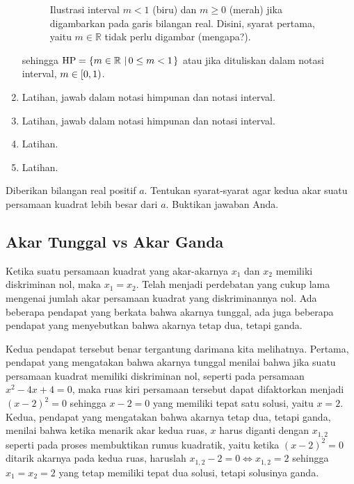 \begin{jawab}
\begin{enumerate}
\begin{minipage}[t]{\linewidth}
\begin{figure}[H]
					\caption{Ilustrasi interval $ m < 1 $ (biru) dan $ m \geq 0 $ (merah) jika digambarkan pada garis bilangan real. Disini, syarat pertama, yaitu $ m \in \mathbb{R} $ tidak perlu digambar (mengapa?).}
				\end{figure}
			\end{minipage}
			sehingga $ \mathop{}\!\mathrm{HP} = \mathop{}\!\left\lbrace{{m \in \mathbb{R}} \, \left|\, {0 \leq m < 1}\right.}\right\rbrace $ atau jika dituliskan dalam notasi interval, $ m \in \mathop{}\!\left[{0, 1}\right) $.
			\item Latihan, jawab dalam notasi himpunan dan notasi interval.
			\item Latihan, jawab dalam notasi himpunan dan notasi interval.
			\item Latihan.
			\item Latihan.
		\end{enumerate}
	\end{jawab}

	\begin{explbox}
		Diberikan bilangan real positif $ a $. Tentukan syarat-syarat agar kedua akar suatu persamaan kuadrat lebih besar dari $ a $. Buktikan jawaban Anda.
	\end{explbox}

\subsection{Akar Tunggal vs Akar Ganda}
	
	Ketika suatu persamaan kuadrat yang akar-akarnya $ x_{1} $ dan $ x_{2} $ memiliki diskriminan nol, maka $ x_{1} = x_{2} $. Telah menjadi perdebatan yang cukup lama mengenai jumlah akar persamaan kuadrat yang diskriminannya nol. Ada beberapa pendapat yang berkata bahwa akarnya tunggal, ada juga beberapa pendapat yang menyebutkan bahwa akarnya tetap dua, tetapi ganda.
	
	\par Kedua pendapat tersebut benar tergantung darimana kita melihatnya. Pertama, pendapat yang mengatakan bahwa akarnya tunggal menilai bahwa jika suatu persamaan kuadrat memiliki diskriminan nol, seperti pada persamaan $ x^{2} - 4x + 4 = 0 $, maka ruas kiri persamaan tersebut dapat difaktorkan menjadi $ \left(x - 2\right)^{2} = 0 $ sehingga $ x - 2 = 0 $ yang memiliki tepat satu solusi, yaitu $ x = 2 $. Kedua, pendapat yang mengatakan bahwa akarnya tetap dua, tetapi ganda, menilai bahwa ketika menarik akar kedua ruas, $ x $ harus diganti dengan $ x_{1, 2} $ seperti pada proses membuktikan rumus kuadratik, yaitu ketika $ \left(x - 2\right)^{2} = 0 $ ditarik akarnya pada kedua ruas, haruslah $ x_{1, 2} - 2 = 0 \iff x_{1, 2} = 2 $ sehingga $ x_{1} = x_{2} = 2 $ yang tetap memiliki tepat dua solusi, tetapi solusinya ganda.
	
